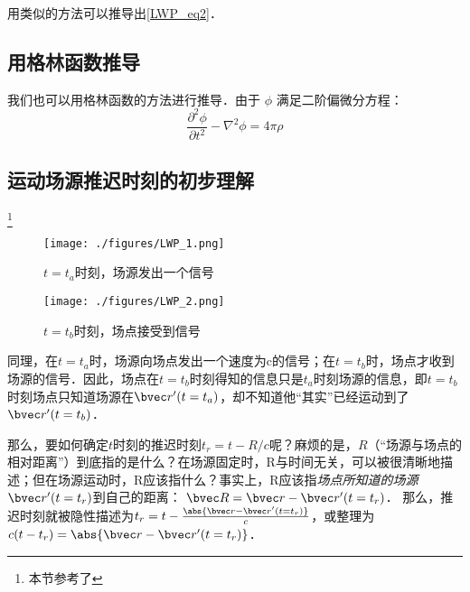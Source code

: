 用类似的方法可以推导出\autoref{LWP_eq2}．

\subsection{用格林函数推导}
我们也可以用格林函数的方法进行推导．由于 $\phi$ 满足二阶偏微分方程：
\begin{equation}
\frac{\partial^2 \phi}{\partial t^2}-\nabla^2 \phi= 4\pi \rho
\end{equation}

\subsection{运动场源推迟时刻的初步理解}
\footnote{本节参考了\cite{GriffE}}
\begin{figure}[ht]
\centering
\texttt{[image: ./figures/LWP\_1.png]}
\caption{$t=t_a$时刻，场源发出一个信号} \label{LWP_fig1}
\end{figure}
\begin{figure}[ht]
\centering
\texttt{[image: ./figures/LWP\_2.png]}
\caption{$t=t_b$时刻，场点接受到信号} \label{LWP_fig2}
\end{figure}
同理，在$t=t_a$时，场源向场点发出一个速度为c的信号；在$t=t_b$时，场点才收到场源的信号．因此，场点在$t=t_b$时刻得知的信息只是$t_a$时刻场源的信息，即$t=t_b$时刻场点只知道场源在$\bvec r'(t=t_a)$，却不知道他“其实”已经运动到了$\bvec r'(t=t_b)$．

那么，要如何确定$t$时刻的推迟时刻$t_r=t-R/c$呢？麻烦的是，$R$（“场源与场点的相对距离”）到底指的是什么？在场源固定时，R与时间无关，可以被很清晰地描述；但在场源运动时，R应该指什么？事实上，R应该指\textsl{场点所知道的场源}$\bvec r'(t=t_r)$到自己的距离： $\bvec R = \bvec r - \bvec r'(t=t_r)$．
那么，推迟时刻就被隐性描述为$t_r=t-\frac{\abs{\bvec r - \bvec r'(t=t_r)}}{c}$，或整理为$c(t-t_r)=\abs{\bvec r - \bvec r'(t=t_r)}$．
